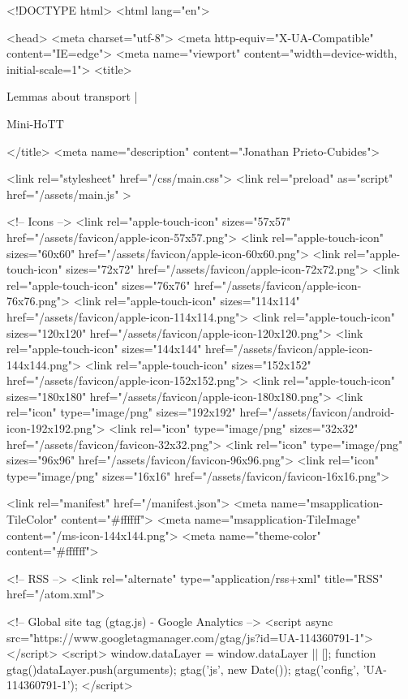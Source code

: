 <!DOCTYPE html>
<html lang="en">

<head>
  <meta charset="utf-8">
  <meta http-equiv="X-UA-Compatible" content="IE=edge">
  <meta name="viewport" content="width=device-width, initial-scale=1">
  <title>
    
      
        Lemmas about transport  |
      
        Mini-HoTT
    
  </title>
  <meta name="description" content="Jonathan Prieto-Cubides">

  <link rel="stylesheet" href="/css/main.css">
  <link rel="preload" as="script" href="/assets/main.js" >

  <!-- Icons -->
  <link rel="apple-touch-icon" sizes="57x57" href="/assets/favicon/apple-icon-57x57.png">
  <link rel="apple-touch-icon" sizes="60x60" href="/assets/favicon/apple-icon-60x60.png">
  <link rel="apple-touch-icon" sizes="72x72" href="/assets/favicon/apple-icon-72x72.png">
  <link rel="apple-touch-icon" sizes="76x76" href="/assets/favicon/apple-icon-76x76.png">
  <link rel="apple-touch-icon" sizes="114x114" href="/assets/favicon/apple-icon-114x114.png">
  <link rel="apple-touch-icon" sizes="120x120" href="/assets/favicon/apple-icon-120x120.png">
  <link rel="apple-touch-icon" sizes="144x144" href="/assets/favicon/apple-icon-144x144.png">
  <link rel="apple-touch-icon" sizes="152x152" href="/assets/favicon/apple-icon-152x152.png">
  <link rel="apple-touch-icon" sizes="180x180" href="/assets/favicon/apple-icon-180x180.png">
  <link rel="icon" type="image/png" sizes="192x192"  href="/assets/favicon/android-icon-192x192.png">
  <link rel="icon" type="image/png" sizes="32x32" href="/assets/favicon/favicon-32x32.png">
  <link rel="icon" type="image/png" sizes="96x96" href="/assets/favicon/favicon-96x96.png">
  <link rel="icon" type="image/png" sizes="16x16" href="/assets/favicon/favicon-16x16.png">

  <link rel="manifest" href="/manifest.json">
  <meta name="msapplication-TileColor" content="#ffffff">
  <meta name="msapplication-TileImage" content="/ms-icon-144x144.png">
  <meta name="theme-color" content="#ffffff">

  <!-- RSS -->
  <link rel="alternate" type="application/rss+xml" title="RSS" href="/atom.xml">

  <!-- Global site tag (gtag.js) - Google Analytics -->
  <script async src="https://www.googletagmanager.com/gtag/js?id=UA-114360791-1"></script>
  <script>
    window.dataLayer = window.dataLayer || [];
    function gtag(){dataLayer.push(arguments);}
    gtag('js', new Date());
    gtag('config', 'UA-114360791-1');
  </script>

